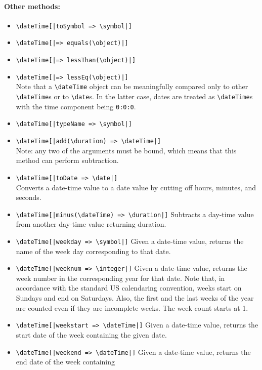 \documentclass[11pt]{article}
\newcommand{\bs}{\textbackslash}
\begin{document}
\paragraph{Other methods:}
\begin{itemize}
\item {\tt \bs{}dateTime[|toSymbol => \bs{}symbol|]}  
\item {\tt \bs{}dateTime[|=> equals(\bs{}object)|]}  
\item {\tt \bs{}dateTime[|=> lessThan(\bs{}object)|]}  
\item {\tt \bs{}dateTime[|=> lessEq(\bs{}object)|]}  
  \\
  Note that a \texttt{\bs{}dateTime} object can be meaningfully compared
  only to other
  \texttt{\bs{}dateTime}s or to \texttt{\bs{}date}s. In the latter case,
  dates are treated as \texttt{\bs{}dateTime}s with the time component
  being \texttt{0:0:0}. 
\item {\tt \bs{}dateTime[|typeName => \bs{}symbol|]}  
\item {\tt \bs{}dateTime[|add(\bs{}duration) => \bs{}dateTime|]}  
  \\
  Note: any two of the arguments must be bound, which means that this
  method can perform subtraction.
\item {\tt \bs{}dateTime[|toDate => \bs{}date|]}    \\
  Converts a date-time value to a date value by cutting off hours, minutes,
  and seconds.
\item {\tt \bs{}dateTime[|minus(\bs{}dateTime) => \bs{}duration|]}
  Subtracts a day-time value from another day-time value returning
  duration.
\item \texttt{\bs{}dateTime[|weekday => \bs{}symbol|]}
  Given a date-time value, returns the name of the week day corresponding
  to that date.
\item \texttt{\bs{}dateTime[|weeknum => \bs{}integer|]}
  Given a date-time value, returns the week number in the corresponding
  year for that date. Note that, in accordance with the standard US
  calendaring convention, weeks start on Sundays and end on Saturdays.
  Also, the first and the last weeks of the year are counted even if they
  are incomplete weeks. The week count starts at 1.
\item \texttt{\bs{}dateTime[|weekstart => \bs{}dateTime|]}
  Given a date-time value, returns the start date of the week containing
  the given date.
\item \texttt{\bs{}dateTime[|weekend => \bs{}dateTime|]}
  Given a date-time value, returns the end date of the week containing

\end{itemize}
\end{document}
